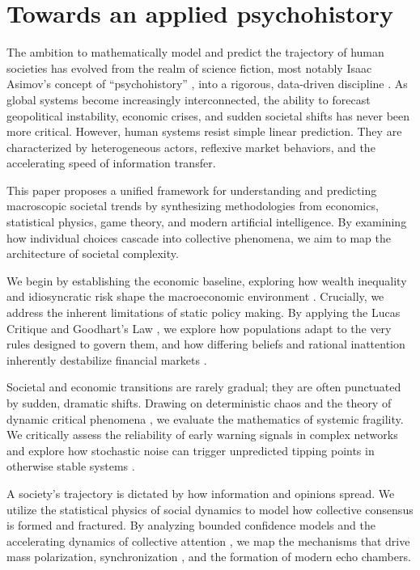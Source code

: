 \documentclass[11pt]{article}
\begin{document}
\section{Towards an applied psychohistory}
\label{sec:intro}

The ambition to mathematically model and predict the trajectory of human societies has evolved from the realm of science fiction, most notably Isaac Asimov's concept of ``psychohistory'' \cite{asimov1951}, into a rigorous, data-driven discipline \cite{turchin2003,turchin2016}. As global systems become increasingly interconnected, the ability to forecast geopolitical instability, economic crises, and sudden societal shifts has never been more critical. However, human systems resist simple linear prediction. They are characterized by heterogeneous actors, reflexive market behaviors, and the accelerating speed of information transfer.

This paper proposes a unified framework for understanding and predicting macroscopic societal trends by synthesizing methodologies from economics, statistical physics, game theory, and modern artificial intelligence. By examining how individual choices cascade into collective phenomena, we aim to map the architecture of societal complexity.

We begin by establishing the economic baseline, exploring how wealth inequality and idiosyncratic risk shape the macroeconomic environment \cite{aiyagari1994,krusellsmith1998,achdou2022}. Crucially, we address the inherent limitations of static policy making. By applying the Lucas Critique \cite{lucas1976} and Goodhart's Law \cite{goodhart1975}, we explore how populations adapt to the very rules designed to govern them, and how differing beliefs and rational inattention \cite{sims2003} inherently destabilize financial markets \cite{brockhommes1998,soros1987,grossmanstiglitz1980}.

Societal and economic transitions are rarely gradual; they are often punctuated by sudden, dramatic shifts. Drawing on deterministic chaos \cite{lorenz1963} and the theory of dynamic critical phenomena \cite{hohenberg1977}, we evaluate the mathematics of systemic fragility. We critically assess the reliability of early warning signals in complex networks \cite{scheffer2009,boettiger2012} and explore how stochastic noise can trigger unpredicted tipping points in otherwise stable systems \cite{boettiger2013,ashwin2012}.

A society's trajectory is dictated by how information and opinions spread. We utilize the statistical physics of social dynamics \cite{castellano2009} to model how collective consensus is formed and fractured. By analyzing bounded confidence models \cite{hegselmannkrause2002,deffuant2000} and the accelerating dynamics of collective attention \cite{lorenzspreen2019}, we map the mechanisms that drive mass polarization, synchronization \cite{strogatz2000}, and the formation of modern echo chambers.
\end{document}

